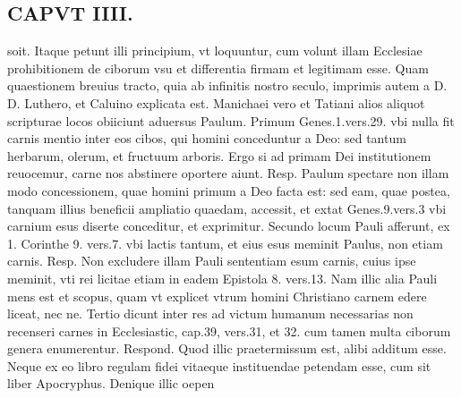 \documentclass{article}
\begin{document}
\begin{pages}
\section*{CAPVT  IIII. }\pstart soit. Itaque petunt illi principium, vt loquuntur, cum volunt illam Ecclesiae prohibitionem de ciborum vsu et differentia firmam et legitimam esse. Quam quaestionem breuius tracto, quia ab infinitis nostro seculo, imprimis autem a D. D. Luthero, et Caluino explicata est. Manichaei vero et Tatiani alios aliquot scripturae locos obiiciunt aduersus Paulum. Primum Genes.1.vers.29. vbi nulla fit carnis mentio inter eos cibos, qui homini conceduntur a Deo: sed tantum herbarum, olerum, et fructuum arboris. Ergo si ad primam Dei institutionem reuocemur, carne nos abstinere oportere aiunt. Resp. Paulum spectare non illam modo concessionem, quae homini primum a Deo facta est: sed eam, quae postea, tanquam illius beneficii ampliatio quaedam, accessit, et extat Genes.9.vers.3 vbi carnium esus diserte conceditur, et exprimitur. Secundo locum Pauli afferunt, ex 1. Corinthe 9. vers.7. vbi lactis tantum, et eius esus meminit Paulus, non etiam carnis. Resp. Non excludere illam Pauli sententiam esum carnis, cuius ipse meminit, vti rei licitae etiam in eadem Epistola 8. vers.13. Nam illic alia Pauli mens est et scopus, quam vt explicet vtrum homini Christiano carnem edere liceat, nec ne. Tertio dicunt inter res ad victum humanum necessarias non recenseri carnes in Ecclesiastic, cap.39, vers.31, et 32. cum tamen multa ciborum genera enumerentur. Respond. Quod illic praetermissum est, alibi additum esse. Neque ex eo libro regulam fidei vitaeque instituendae petendam esse, cum sit liber Apocryphus. Denique illic oepen\pend

\end{pages}
\end{document}
